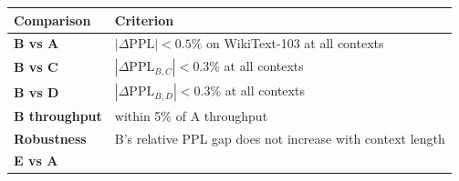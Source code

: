 \documentclass[
  11pt,
]{article}
\begin{document}
\begin{longtable}[]{@{}ll@{}}
\toprule
\begin{minipage}[b]{0.47\columnwidth}\raggedright
Comparison\strut
\end{minipage} & \begin{minipage}[b]{0.47\columnwidth}\raggedright
Criterion\strut
\end{minipage}\tabularnewline
\midrule
\endhead
\begin{minipage}[t]{0.47\columnwidth}\raggedright
\textbf{B vs A}\strut
\end{minipage} & \begin{minipage}[t]{0.47\columnwidth}\raggedright
\(|\Delta\mathrm{PPL}| < 0.5\%\) on WikiText-103 at all contexts\strut
\end{minipage}\tabularnewline
\begin{minipage}[t]{0.47\columnwidth}\raggedright
\textbf{B vs C}\strut
\end{minipage} & \begin{minipage}[t]{0.47\columnwidth}\raggedright
\(|\Delta\mathrm{PPL}_{B,C}| < 0.3\%\) at all contexts\strut
\end{minipage}\tabularnewline
\begin{minipage}[t]{0.47\columnwidth}\raggedright
\textbf{B vs D}\strut
\end{minipage} & \begin{minipage}[t]{0.47\columnwidth}\raggedright
\(|\Delta\mathrm{PPL}_{B,D}| < 0.3\%\) at all contexts\strut
\end{minipage}\tabularnewline
\begin{minipage}[t]{0.47\columnwidth}\raggedright
\textbf{B throughput}\strut
\end{minipage} & \begin{minipage}[t]{0.47\columnwidth}\raggedright
within 5\% of A throughput\strut
\end{minipage}\tabularnewline
\begin{minipage}[t]{0.47\columnwidth}\raggedright
\textbf{Robustness}\strut
\end{minipage} & \begin{minipage}[t]{0.47\columnwidth}\raggedright
B's relative PPL gap does not increase with context length\strut
\end{minipage}\tabularnewline
\begin{minipage}[t]{0.47\columnwidth}\raggedright
\textbf{E vs A}\strut
\end{minipage} & \begin{minipage}[t]{0.47\columnwidth}\raggedright

\end{minipage}
\end{longtable}
\end{document}
